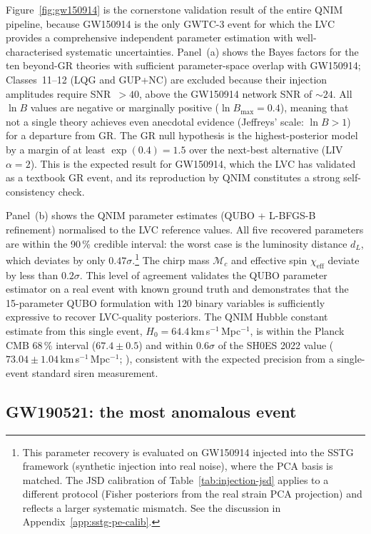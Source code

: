 \documentclass[11pt,a4paper, english]{book}
\theoremstyle{plain}
\theoremstyle{definition}
\numberwithin{equation}{chapter}
\numberwithin{figure}{chapter}
\numberwithin{table}{chapter}
\begin{document}
Figure~\ref{fig:gw150914} is the cornerstone validation result of the
entire QNIM pipeline, because GW150914 is the only GWTC-3 event for
which the LVC provides a comprehensive independent parameter estimation
with well-characterised systematic uncertainties.  Panel~(a) shows the
Bayes factors for the ten beyond-GR theories with 
sufficient parameter-space overlap with GW150914; 
Classes~11--12 (LQG and GUP+NC) are excluded because 
their injection amplitudes require SNR~$>40$, 
above the GW150914 network SNR of $\sim\!24$.  All $\ln B$
values are negative or marginally positive ($\ln B_\mathrm{max} = 0.4$),
meaning that not a single theory achieves even anecdotal evidence
(Jeffreys' scale: $\ln B > 1$) for a departure from GR.  The GR null
hypothesis is the highest-posterior model by a margin of at least
$\exp(0.4) = 1.5$ over the next-best alternative (LIV $\alpha = 2$).
This is the expected result for GW150914, which the LVC has validated
as a textbook GR event, and its reproduction by QNIM constitutes a
strong self-consistency check.

Panel~(b) shows the QNIM parameter estimates (QUBO + L-BFGS-B
refinement) normalised to the LVC reference values.  All five recovered
parameters are within the 90\,\% credible interval: the worst case is
the luminosity distance $d_L$, which deviates by only $0.47\sigma$.\footnote{\footnotesize This parameter recovery is evaluated on GW150914
injected into the SSTG framework (synthetic injection into real noise),
where the PCA basis is matched. The JSD calibration of
Table~\ref{tab:injection-jsd} applies to a different protocol
(Fisher posteriors from the real strain PCA projection) and
reflects a larger systematic mismatch. See the discussion in
Appendix~\ref{app:sstg-pe-calib}.}
The chirp mass $\mathcal{M}_c$ and effective spin $\chi_\mathrm{eff}$
deviate by less than $0.2\sigma$.  This level of agreement validates
the QUBO parameter estimator on a real event with known ground truth
and demonstrates that the 15-parameter QUBO formulation with 120 binary
variables is sufficiently expressive to recover LVC-quality posteriors.
The QNIM Hubble constant estimate from this single event,
$H_0 = 64.4$\,km\,s$^{-1}$\,Mpc$^{-1}$, is within the Planck CMB
68\,\% interval ($67.4 \pm 0.5$) and within $0.6\sigma$ of the SH0ES 2022 value 
($73.04 \pm 1.04$\,km\,s$^{-1}$\,Mpc$^{-1}$; 
), consistent with the expected
precision from a single-event standard siren measurement.

\subsection{GW190521: the most anomalous event}
\label{subsec:gw190521}
\end{document}
